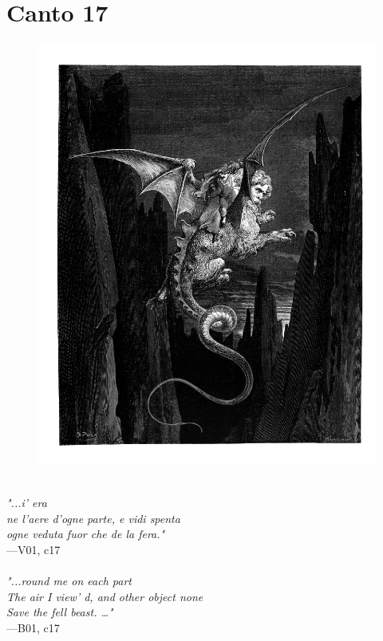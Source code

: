 \documentclass[../Dore_vision.tex]{subfiles}
\begin{document}
\newpage

\section{Canto 17}

\begin{figure}[ht]
\centering
\includegraphics[height=\figsize]{illustrations/book_1/V01, c17.jpg}
\end{figure}

\begin{center}
\begin{minipage}{0.8\linewidth}
\textit{\\
"...i’ era\\ne l’aere d’ogne parte, e vidi spenta\\ogne veduta fuor che de la fera."} \\
—V01, c17 \\~\\
\textit{"...round me on each part\\The air I view' d, and other object none\\Save the fell beast. …"} \\
—B01, c17
\end{minipage}
\end{center}
\end{document}
